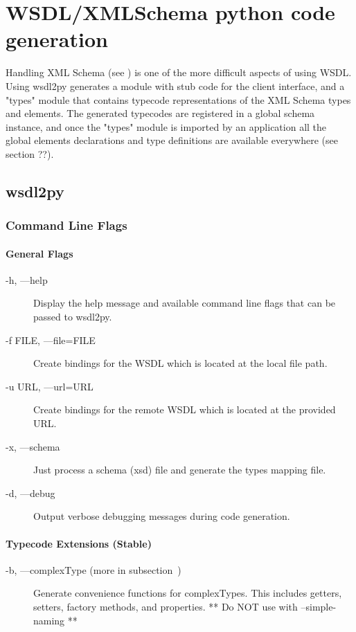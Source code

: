 \chapter{WSDL/XMLSchema python code generation}

Handling XML Schema (see ) 
is one of the more difficult aspects of using WSDL.  
Using wsdl2py generates a module with stub code for the client interface,
and a "types" module that contains typecode representations of the XML Schema types and elements.  The generated typecodes are registered in a global schema instance, and once the "types" module is imported by an application all the global elements declarations and type definitions are available everywhere (see section ??).  

\section{wsdl2py}

\subsection{Command Line Flags}

\subsubsection{General Flags}
\begin{description}
\item[-h, ---help] Display the help message and available command line
flags that can be passed to wsdl2py.
\item[-f FILE, ---file=FILE] Create bindings for the WSDL which is located at
the local file path.
\item[-u URL, ---url=URL] Create bindings for the remote WSDL which is located
at the provided URL.
\item[-x, ---schema] Just process a schema (xsd) file and generate the types
mapping file.
\item[-d, ---debug] Output verbose debugging messages during code generation.
\end{description}

\subsubsection{Typecode Extensions (Stable) }
\begin{description}
\item[-b, ---complexType (more in subsection~\label{subsubsection:complexType})]
Generate convenience functions for complexTypes.  This includes getters,
setters, factory methods, and properties.  ** Do NOT use with --simple-naming **
\end{description}

